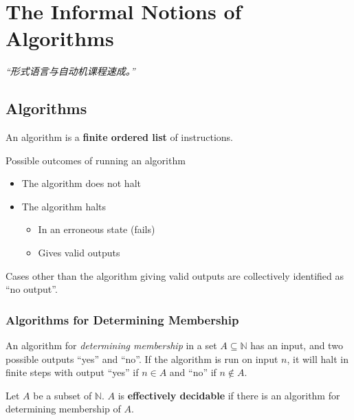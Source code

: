 \chapter{The Informal Notions of Algorithms}

\emph{“形式语言与自动机课程速成。”}

\section{Algorithms}

\begin{definition}
    \label{def:Algorithm}
    An algorithm is a \textbf{finite ordered list} of instructions.
\end{definition}

Possible outcomes of running an algorithm
\begin{itemize}
    \item The algorithm does not halt
    \item The algorithm halts
    \begin{itemize}
        \item In an erroneous state (fails)
        \item Gives valid outputs
    \end{itemize}
\end{itemize}
Cases other than the algorithm giving valid outputs are collectively identified as ``no output''.

\subsection{Algorithms for Determining Membership}
\label{sub:AlgoForDeterminingMembership}

\begin{definition}
    \label{def:AlgoForDeterminingMembership}
    An algorithm for \emph{determining membership} in a set $A \subseteq \mathbb{N}$ has an input, and two possible outputs ``yes'' and ``no''. If the algorithm is run on input $n$, it will halt in finite steps with output ``yes'' if $n \in A$ and ``no'' if $n \notin A$.
\end{definition}

\begin{definition}
    \label{def:EffectivelyDecidableSet}
    Let $A$ be a subset of $\mathbb{N}$. $A$ is \textbf{effectively decidable} if there is an algorithm for determining membership of $A$.
\end{definition}

